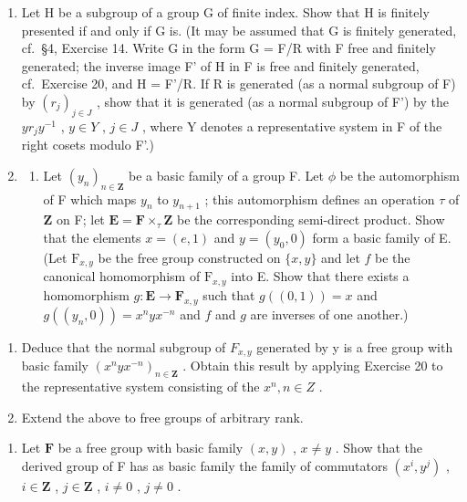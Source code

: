 \begin{enumerate}
\def\labelenumi{\arabic{enumi}.}
\setcounter{enumi}{20}
\item
  Let H be a subgroup of a group G of finite index. Show that H is finitely presented if and only if G is. (It may be assumed that G is finitely generated, cf.~§4, Exercise 14. Write G in the form G = F/R with F free and finitely generated; the inverse image F' of H in F is free and finitely generated, cf.~Exercise 20, and H = F'/R. If R is generated (as a normal subgroup of F) by \((r_{j})_{j\in J}\) , show that it is generated (as a normal subgroup of F') by the \(yr_{j}y^{-1}\) , \(y\in Y\) , \(j\in J\) , where Y denotes a representative system in F of the right cosets modulo F'.)
\item
  \begin{enumerate}
  \def\labelenumii{(\alph{enumii})}
  \tightlist
  \item
    Let \((y_{n})_{n\in \mathbf{Z}}\) be a basic family of a group F. Let \(\phi\) be the automorphism of F which maps \(y_{n}\) to \(y_{n + 1}\) ; this automorphism defines an operation \(\tau\) of \(\mathbf{Z}\) on F; let \(\mathbf{E} = \mathbf{F}\times_{\tau}\mathbf{Z}\) be the corresponding semi-direct product. Show that the elements \(x = (e,1)\) and \(y = (y_0,0)\) form a basic family of E. (Let \(\mathrm{F}_{x,y}\) be the free group constructed on \(\{x,y\}\) and let \(f\) be the canonical homomorphism of \(\mathrm{F}_{x,y}\) into E. Show that there exists a homomorphism \(g\colon \mathbf{E}\to \mathbf{F}_{x,y}\) such that \(g((0,1)) = x\) and \(g((y_n,0)) = x^n yx^{-n}\) and \(f\) and \(g\) are inverses of one another.)
  \end{enumerate}
\end{enumerate}

\begin{enumerate}
\def\labelenumi{(\alph{enumi})}
\setcounter{enumi}{1}
\item
  Deduce that the normal subgroup of \(F_{x,y}\) generated by y is a free group with basic family \((x^{n}yx^{-n})_{n\in\mathbf{Z}}\) . Obtain this result by applying Exercise 20 to the representative system consisting of the \(x^{n}, n\in Z\) .
\item
  Extend the above to free groups of arbitrary rank.
\end{enumerate}

\begin{enumerate}
\def\labelenumi{\arabic{enumi}.}
\setcounter{enumi}{22}
\tightlist
\item
  Let \(\mathbf{F}\) be a free group with basic family \((x, y)\) , \(x \neq y\) . Show that the derived group of F has as basic family the family of commutators \((x^i, y^j)\) , \(i \in \mathbf{Z}\) , \(j \in \mathbf{Z}\) , \(i \neq 0\) , \(j \neq 0\) .
\end{enumerate}

